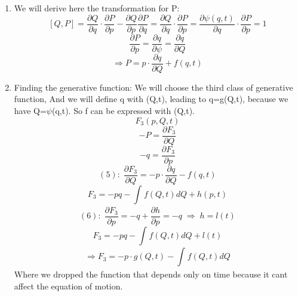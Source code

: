 \documentclass[11pt,fleqn]{article}
\newcommand{\Dn}{\vspace*{3mm}}
\begin{document}
\Dn
\begin{enumerate}
\item We will derive here the transformation for P:
\begin{equation}
\left[Q,P\right]=\frac{\partial Q}{\partial q}\cdot\frac{\partial P}{\partial p}-\frac{\partial Q}{\partial p}\frac{\partial P}{\partial q}=\frac{\partial Q}{\partial q}\cdot\frac{\partial P}{\partial p}=\frac{\partial \psi(q,t)}{\partial q}\cdot\frac{\partial P}{\partial p}=1
\end{equation}
\begin{equation}
\frac{\partial P}{\partial p}=\frac{\partial q}{\partial \psi}=\frac{\partial q}{\partial Q}
\end{equation}
\begin{equation}
\Rightarrow 
\boxed {P=p\cdot\frac{\partial q}{\partial Q}+f(q,t)}
\end{equation}
\item Finding the generative function:
\newline
We will choose the third class of generative function, And we will define q with (Q,t), leading to q=g(Q,t), because we have Q=$\psi$(q,t). So f can be expressed with (Q,t).
\begin{equation}
F_{3}(p,Q,t)
\end{equation}
\begin{equation}
-P=\frac{\partial F_{3}}{\partial Q}
\end{equation}
\begin{equation}
-q=\frac{\partial F_{3}}{\partial p}
\end{equation}
\newline
\begin{equation}
(5): \;\frac{\partial F_{3}}{\partial Q}=-p\cdot\frac{\partial q}{\partial Q}-f(q,t)
\end{equation}
\begin{equation}
F_{3}=-pq-\int_{}^{} f(Q,t)dQ+h(p,t)
\end{equation}
\begin{equation}
(6):\;\frac{\partial F_{3}}{\partial p}=-q+\frac{\partial h}{\partial p}=-q \; \Rightarrow\; h=l(t)
\end{equation}
\begin{equation}
F_{3}=-pq-\int_{}^{} f(Q,t)dQ+l(t) 
\end{equation}
\begin{equation}
\Rightarrow \boxed{F_{3}=-p\cdot g(Q,t)-\int_{}^{} f(Q,t)dQ}
\end{equation}
Where we dropped the function that depends only on time because it cant affect the equation of motion.

\end{enumerate}
\end{document}
